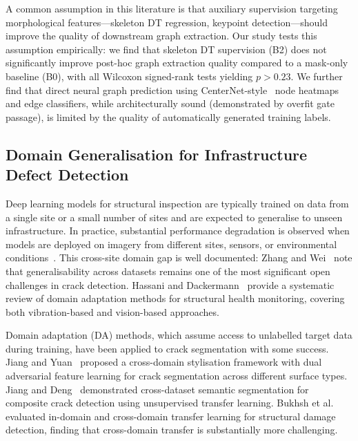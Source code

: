 \documentclass[preprint,12pt]{elsarticle}
\begin{document}
A common assumption in this literature is that auxiliary supervision targeting morphological features---skeleton DT regression, keypoint detection---should improve the quality of downstream graph extraction. Our study tests this assumption empirically: we find that skeleton DT supervision (B2) does not significantly improve post-hoc graph extraction quality compared to a mask-only baseline (B0), with all Wilcoxon signed-rank tests yielding $p > 0.23$. We further find that direct neural graph prediction using CenterNet-style~\cite{zhou2019centernet} node heatmaps and edge classifiers, while architecturally sound (demonstrated by overfit gate passage), is limited by the quality of automatically generated training labels.

\subsection{Domain Generalisation for Infrastructure Defect Detection}
\label{sec:rw_dg}

Deep learning models for structural inspection are typically trained on data from a single site or a small number of sites and are expected to generalise to unseen infrastructure. In practice, substantial performance degradation is observed when models are deployed on imagery from different sites, sensors, or environmental conditions~\cite{koch2015review, bukhsh2021damage}. This cross-site domain gap is well documented: Zhang and Wei~\cite{zhang2025crackreview} note that generalisability across datasets remains one of the most significant open challenges in crack detection. Hassani and Dackermann~\cite{hassani2025dashm} provide a systematic review of domain adaptation methods for structural health monitoring, covering both vibration-based and vision-based approaches.

Domain adaptation (DA) methods, which assume access to unlabelled target data during training, have been applied to crack segmentation with some success. Jiang and Yuan~\cite{jiang2025udacrack} proposed a cross-domain stylisation framework with dual adversarial feature learning for crack segmentation across different surface types. Jiang and Deng~\cite{jiang2025crossdataset} demonstrated cross-dataset semantic segmentation for composite crack detection using unsupervised transfer learning. Bukhsh et al.~\cite{bukhsh2021damage} evaluated in-domain and cross-domain transfer learning for structural damage detection, finding that cross-domain transfer is substantially more challenging.
\end{document}
